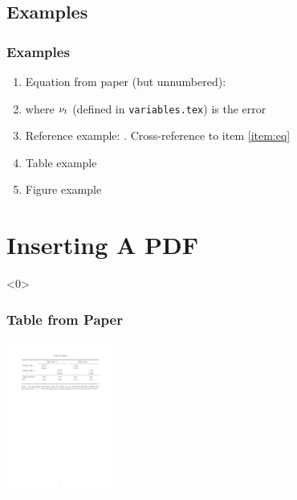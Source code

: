 \documentclass[12pt,aspectratio=169,xcolor=dvipsnames,hyperref={colorlinks=true,linkcolor=blue,citecolor=black}]{beamer}
\newcounter{currentenumi}									%
\begin{document}
\subsection[]{Examples}

\begin{frame}[label=examples]
	\frametitle{Examples}
	\begin{enumerate}
		\item Equation from paper (but unnumbered): \label{item:eq}
		
		\vspace{-1cm}
		\item<1->[] where \(\nu_{t}\) (defined in \texttt{variables.tex}) is the error
		\item[\ding{43}] Reference example: \cite{ChangLi:2017AER}. Cross-reference to item \ref{item:eq}
		\setcounter{currentenumi}{\theenumi}				%
		\setcounter{enumi}{\thecurrentenumi+1}				%
		\item Table example \hyperlink{tableex}{}
		\item Figure example \hyperlink{figureex}{}
		
	\end{enumerate}

\end{frame}


\section[]{Inserting A PDF}

\begin{frame}<0>											%
	\frametitle{Table from Paper}
	\begin{center}
		\includegraphics[trim={3cm 21.15cm 3cm 3cm},clip,height=5cm,width=\textwidth,keepaspectratio]{../Tables/extabpdf.pdf}
	\end{center}
\end{frame}
\end{document}
